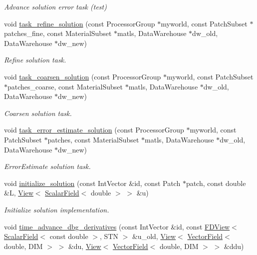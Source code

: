 \begin{DoxyCompactItemize}
\begin{DoxyCompactList}\small\item\em Advance solution error task (test) \end{DoxyCompactList}\item 
void \hyperlink{classUintah_1_1PhaseField_1_1Heat_a453059c9ee7e3920bd24ecc2882f42d7}{task\+\_\+refine\+\_\+solution} (const Processor\+Group $\ast$myworld, const Patch\+Subset $\ast$patches\+\_\+fine, const Material\+Subset $\ast$matls, Data\+Warehouse $\ast$dw\+\_\+old, Data\+Warehouse $\ast$dw\+\_\+new)
\begin{DoxyCompactList}\small\item\em Refine solution task. \end{DoxyCompactList}\item 
void \hyperlink{classUintah_1_1PhaseField_1_1Heat_a73770e2d2271bbab30b3b67462c32a1c}{task\+\_\+coarsen\+\_\+solution} (const Processor\+Group $\ast$myworld, const Patch\+Subset $\ast$patches\+\_\+coarse, const Material\+Subset $\ast$matls, Data\+Warehouse $\ast$dw\+\_\+old, Data\+Warehouse $\ast$dw\+\_\+new)
\begin{DoxyCompactList}\small\item\em Coarsen solution task. \end{DoxyCompactList}\item 
void \hyperlink{classUintah_1_1PhaseField_1_1Heat_aa0622afb02c0f71f50e9206c342f379b}{task\+\_\+error\+\_\+estimate\+\_\+solution} (const Processor\+Group $\ast$myworld, const Patch\+Subset $\ast$patches, const Material\+Subset $\ast$matls, Data\+Warehouse $\ast$dw\+\_\+old, Data\+Warehouse $\ast$dw\+\_\+new)
\begin{DoxyCompactList}\small\item\em Error\+Estimate solution task. \end{DoxyCompactList}\item 
void \hyperlink{classUintah_1_1PhaseField_1_1Heat_a835efcc2e173c6b1ab0f38cfbd3745f9}{initialize\+\_\+solution} (const Int\+Vector \&id, const Patch $\ast$patch, const double \&L, \hyperlink{namespaceUintah_1_1PhaseField_a59210a1e28eba254d428762c92ddeabb}{View}$<$ \hyperlink{structUintah_1_1PhaseField_1_1ScalarField}{Scalar\+Field}$<$ double $>$ $>$ \&u)
\begin{DoxyCompactList}\small\item\em Initialize solution implementation. \end{DoxyCompactList}\item 
void \hyperlink{classUintah_1_1PhaseField_1_1Heat_ae44ac96e2901f80ecd11207ad4c51ee0}{time\+\_\+advance\+\_\+dbg\+\_\+derivatives} (const Int\+Vector \&id, const \hyperlink{namespaceUintah_1_1PhaseField_a63032464b1cd54eaa53c1c29109746ac}{F\+D\+View}$<$ \hyperlink{structUintah_1_1PhaseField_1_1ScalarField}{Scalar\+Field}$<$ const double $>$, S\+TN $>$ \&u\+\_\+old, \hyperlink{namespaceUintah_1_1PhaseField_a59210a1e28eba254d428762c92ddeabb}{View}$<$ \hyperlink{structUintah_1_1PhaseField_1_1VectorField}{Vector\+Field}$<$ double, D\+IM $>$ $>$ \&du, \hyperlink{namespaceUintah_1_1PhaseField_a59210a1e28eba254d428762c92ddeabb}{View}$<$ \hyperlink{structUintah_1_1PhaseField_1_1VectorField}{Vector\+Field}$<$ double, D\+IM $>$ $>$ \&ddu)

\end{DoxyCompactItemize}
